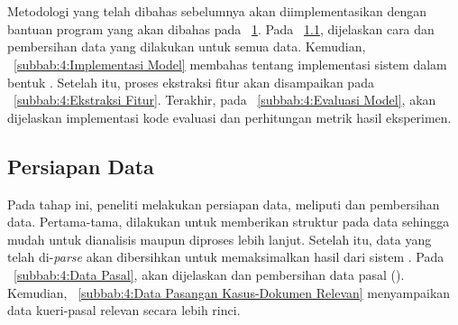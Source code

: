 \chapter{\babEmpat}
\label{bab:4}
Metodologi yang telah dibahas sebelumnya akan diimplementasikan dengan bantuan program yang akan dibahas pada \bab{}~\ref{bab:4}. Pada \subbab{}~\ref{subbab:4:Persiapan Data}, dijelaskan cara \parsing{} dan pembersihan data yang dilakukan untuk semua \file{} data. Kemudian, \subbab{}~\ref{subbab:4:Implementasi Model} membahas tentang implementasi sistem \ir{} dalam bentuk \pipeline{}. Setelah itu, proses ekstraksi fitur akan disampaikan pada \subbab{}~\ref{subbab:4:Ekstraksi Fitur}. Terakhir, pada \subbab{}~\ref{subbab:4:Evaluasi Model}, akan dijelaskan implementasi kode evaluasi dan perhitungan metrik hasil eksperimen.
\section{Persiapan Data}
\label{subbab:4:Persiapan Data}
Pada tahap ini, peneliti melakukan persiapan data, meliputi \parsing{} dan pembersihan data. Pertama-tama, \parsing{} dilakukan untuk memberikan struktur pada data sehingga mudah untuk dianalisis maupun diproses lebih lanjut. Setelah itu, data yang telah di-\textit{parse} akan dibersihkan untuk memaksimalkan hasil dari sistem \ir{}. Pada \subbab{}~\ref{subbab:4:Data Pasal}, akan dijelaskan \parsing{} dan pembersihan data pasal (\corpus{}). Kemudian, \subbab{}~\ref{subbab:4:Data Pasangan Kasus-Dokumen Relevan} menyampaikan \parsing{} data kueri-pasal relevan secara lebih rinci.
